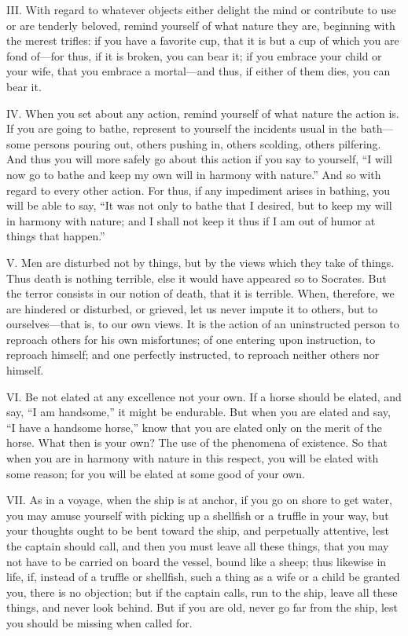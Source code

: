 \documentclass[a4paper]{article}
\begin{document}
III. With regard to whatever objects either delight the mind or contribute to
use or are tenderly beloved, remind yourself of what nature they are,
beginning with the merest trifles: if you have a favorite cup, that it is
but a cup of which you are fond of—for thus, if it is broken, you can
bear it; if you embrace your child or your wife, that you embrace a
mortal—and thus, if either of them dies, you can bear it.


IV. When you set about any action, remind yourself of what nature the action
is. If you are going to bathe, represent to yourself the incidents usual
in the bath—some persons pouring out, others pushing in, others scolding,
others pilfering. And thus you will more safely go about this action if
you say to yourself, “I will now go to bathe and keep my own will in
harmony with nature.” And so with regard to every other action. For thus,
if any impediment arises in bathing, you will be able to say, “It was not
only to bathe that I desired, but to keep my will in harmony with nature;
and I shall not keep it thus if I am out of humor at things that happen.”


V. Men are disturbed not by things, but by the views which they take of
things. Thus death is nothing terrible, else it would have appeared so to
Socrates. But the terror consists in our notion of death, that it is
terrible. When, therefore, we are hindered or disturbed, or grieved, let
us never impute it to others, but to ourselves—that is, to our own views.
It is the action of an uninstructed person to reproach others for his own
misfortunes; of one entering upon instruction, to reproach himself; and
one perfectly instructed, to reproach neither others nor himself.

VI. Be not elated at any excellence not your own. If a horse should be
elated, and say, “I am handsome,” it might be endurable. But when you are
elated and say, “I have a handsome horse,” know that you are elated only
on the merit of the horse. What then is your own? The use of the
phenomena of existence. So that when you are in harmony with nature in
this respect, you will be elated with some reason; for you will be elated
at some good of your own.


VII. As in a voyage, when the ship is at anchor, if you go on shore to get
water, you may amuse yourself with picking up a shellfish or a truffle in
your way, but your thoughts ought to be bent toward the ship, and
perpetually attentive, lest the captain should call, and then you must
leave all these things, that you may not have to be carried on board the
vessel, bound like a sheep; thus likewise in life, if, instead of a
truffle or shellfish, such a thing as a wife or a child be granted you,
there is no objection; but if the captain calls, run to the ship, leave
all these things, and never look behind. But if you are old, never go far
from the ship, lest you should be missing when called for.
\end{document}
